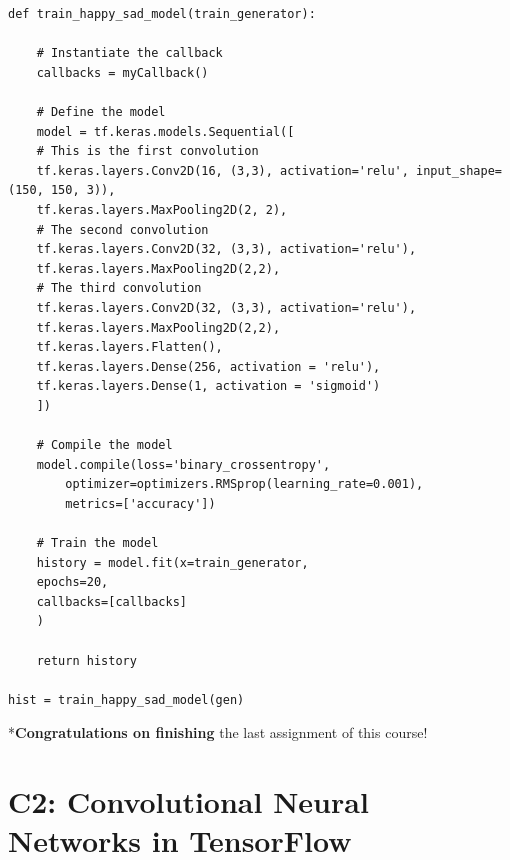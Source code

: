 \documentclass[20pt]{article}
\begin{document}
\begin{itemize}
\begin{verbatim}
def train_happy_sad_model(train_generator):

	# Instantiate the callback
	callbacks = myCallback()
	
	# Define the model
	model = tf.keras.models.Sequential([
	# This is the first convolution
	tf.keras.layers.Conv2D(16, (3,3), activation='relu', input_shape=(150, 150, 3)),
	tf.keras.layers.MaxPooling2D(2, 2),
	# The second convolution
	tf.keras.layers.Conv2D(32, (3,3), activation='relu'),
	tf.keras.layers.MaxPooling2D(2,2),
	# The third convolution
	tf.keras.layers.Conv2D(32, (3,3), activation='relu'),
	tf.keras.layers.MaxPooling2D(2,2),
	tf.keras.layers.Flatten(),
	tf.keras.layers.Dense(256, activation = 'relu'),
	tf.keras.layers.Dense(1, activation = 'sigmoid')
	])
	
	# Compile the model
	model.compile(loss='binary_crossentropy',
		optimizer=optimizers.RMSprop(learning_rate=0.001),
		metrics=['accuracy'])     
		
	# Train the model
	history = model.fit(x=train_generator,
	epochs=20,
	callbacks=[callbacks]
	)
	
	return history
	
hist = train_happy_sad_model(gen)
	\end{verbatim}
	*\textbf{Congratulations on finishing} the last assignment of this course!
	\end{itemize}
	
	\section{C2: Convolutional Neural Networks in TensorFlow}
\end{document}
